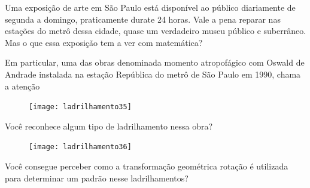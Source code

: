 
Uma exposição de arte em São Paulo está disponível ao público diariamente de segunda a domingo, praticamente durate 24 horas. Vale a pena reparar nas estações do metrô dessa cidade, quase um verdadeiro museu público e suberrâneo. Mas o que essa exposição tem a ver com matemática?

Em particular, uma das obras denominada momento atropofágico com Oswald de Andrade instalada na estação República do metrô de São Paulo em 1990, chama a atenção

\begin{figure}[H]
\centering
\texttt{[image: ladrilhamento35]}

\end{figure}

Você reconhece algum tipo de ladrilhamento nessa obra?

\begin{figure}[H]
\centering
\texttt{[image: ladrilhamento36]}

\end{figure}

Você consegue perceber como a transformação geométrica rotação é utilizada para determinar um padrão nesse ladrilhamentos?

